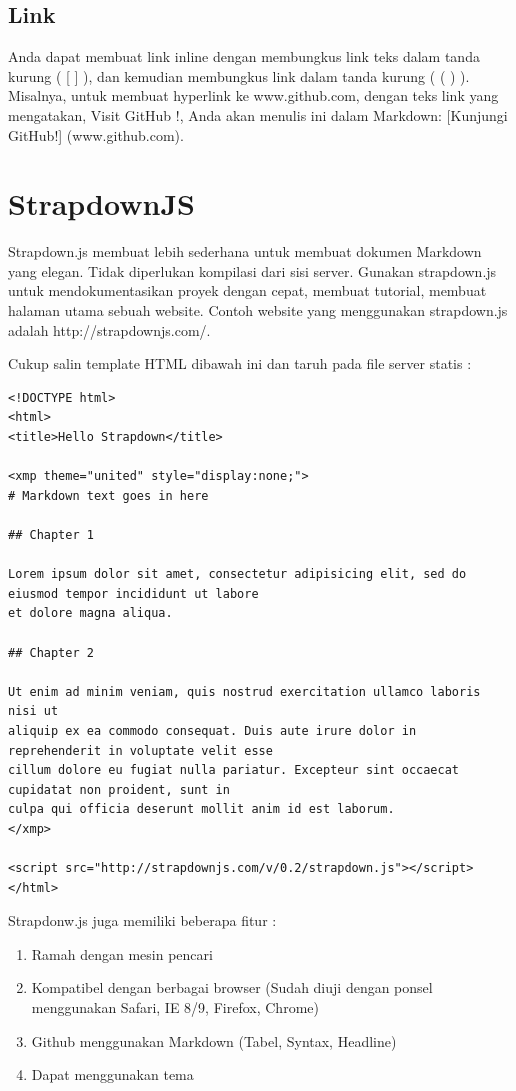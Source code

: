 \subsection{Link}
Anda dapat membuat link inline dengan membungkus link teks dalam tanda kurung ( [ ] ), dan kemudian membungkus link dalam tanda kurung ( ( ) ).
Misalnya, untuk membuat hyperlink ke www.github.com, dengan teks link yang mengatakan, Visit GitHub !, Anda akan menulis ini dalam Markdown: [Kunjungi GitHub!] (www.github.com).

\section{StrapdownJS \cite{Strapdownjs:2014}}
\label{sec:stapdownjs}

Strapdown.js membuat lebih sederhana untuk membuat dokumen Markdown yang elegan. Tidak diperlukan kompilasi dari sisi server. Gunakan strapdown.js untuk mendokumentasikan proyek dengan cepat, membuat tutorial, membuat halaman utama sebuah website. Contoh website yang menggunakan strapdown.js adalah http://strapdownjs.com/.

Cukup salin template HTML dibawah ini dan taruh pada file server statis :
\begin{lstlisting}
<!DOCTYPE html>
<html>
<title>Hello Strapdown</title>

<xmp theme="united" style="display:none;">
# Markdown text goes in here

## Chapter 1

Lorem ipsum dolor sit amet, consectetur adipisicing elit, sed do eiusmod tempor incididunt ut labore
et dolore magna aliqua. 

## Chapter 2

Ut enim ad minim veniam, quis nostrud exercitation ullamco laboris nisi ut
aliquip ex ea commodo consequat. Duis aute irure dolor in reprehenderit in voluptate velit esse
cillum dolore eu fugiat nulla pariatur. Excepteur sint occaecat cupidatat non proident, sunt in
culpa qui officia deserunt mollit anim id est laborum.
</xmp>

<script src="http://strapdownjs.com/v/0.2/strapdown.js"></script>
</html>
\end{lstlisting}

Strapdonw.js juga memiliki beberapa fitur :
\begin{enumerate}
\item Ramah dengan mesin pencari
\item Kompatibel dengan berbagai browser (Sudah diuji dengan ponsel menggunakan Safari, IE 8/9, Firefox, Chrome)
\item Github menggunakan Markdown (Tabel, Syntax, Headline)
\item Dapat menggunakan tema
\end{enumerate}

